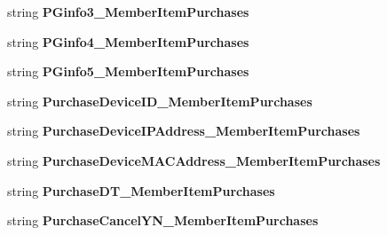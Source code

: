 \begin{DoxyCompactItemize}
\item 
string {\bfseries P\+Ginfo3\+\_\+\+Member\+Item\+Purchases}\hypertarget{a00124_a569dbfa8a6c49603cc57558a66b0c8ec}{}\label{a00124_a569dbfa8a6c49603cc57558a66b0c8ec}

\item 
string {\bfseries P\+Ginfo4\+\_\+\+Member\+Item\+Purchases}\hypertarget{a00124_a4b60e3e6f35e8f5d819c5e9366048d5c}{}\label{a00124_a4b60e3e6f35e8f5d819c5e9366048d5c}

\item 
string {\bfseries P\+Ginfo5\+\_\+\+Member\+Item\+Purchases}\hypertarget{a00124_ad9b097cf9fa0a9f0386dbe788bcea154}{}\label{a00124_ad9b097cf9fa0a9f0386dbe788bcea154}

\item 
string {\bfseries Purchase\+Device\+I\+D\+\_\+\+Member\+Item\+Purchases}\hypertarget{a00124_a4c68a9611af7bb0f107840e9e26d6364}{}\label{a00124_a4c68a9611af7bb0f107840e9e26d6364}

\item 
string {\bfseries Purchase\+Device\+I\+P\+Address\+\_\+\+Member\+Item\+Purchases}\hypertarget{a00124_ab2983e869f154d2e6d306b3fd2c77519}{}\label{a00124_ab2983e869f154d2e6d306b3fd2c77519}

\item 
string {\bfseries Purchase\+Device\+M\+A\+C\+Address\+\_\+\+Member\+Item\+Purchases}\hypertarget{a00124_ac1a43ff607952be91f4b58aca9d6e066}{}\label{a00124_ac1a43ff607952be91f4b58aca9d6e066}

\item 
string {\bfseries Purchase\+D\+T\+\_\+\+Member\+Item\+Purchases}\hypertarget{a00124_a77cdcebc444afddd598c5b15d913fcb4}{}\label{a00124_a77cdcebc444afddd598c5b15d913fcb4}

\item 
string {\bfseries Purchase\+Cancel\+Y\+N\+\_\+\+Member\+Item\+Purchases}\hypertarget{a00124_ae060fea491ebfda5230dcdf1364c2b14}{}\label{a00124_ae060fea491ebfda5230dcdf1364c2b14}


\end{DoxyCompactItemize}
